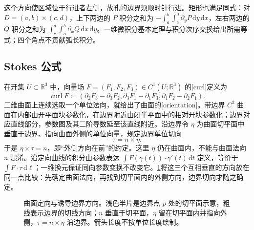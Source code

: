 这个方向使区域位于行进者左侧，故孔的边界须顺时针行进。矩形也满足同式：对 \(D=(a,b)\times(c,d)\)，上下两边的 \(P\) 积分之和为 \(-\int_a^b\int_c^d\partial_yP\,\mathrm dy\,\mathrm dx\)，左右两边的 \(Q\) 积分之和为 \(\int_c^d\int_a^b\partial_xQ\,\mathrm dx\,\mathrm dy\)。一维微积分基本定理与积分次序交换给出所需等式；四个角点不贡献弧长积分。

\subsection{Stokes 公式}
\label{b2:subsec:010205}

在开集 \(U\subset\mathbb R^3\) 中，向量场 \(F=(F_1,F_2,F_3)\in C^1(U;\mathbb R^3)\) 的[curl]定义为
\[
 \operatorname{curl}F\coloneqq
 (\partial_2F_3-\partial_3F_2,
  \partial_3F_1-\partial_1F_3,
  \partial_1F_2-\partial_2F_1).
\]
二维曲面上连续选取一个单位法向，就给出了曲面的[orientation]。带边界 \(C^2\) 曲面在内部由开平面块参数化，在边界附近由闭半平面中的相对开块参数化；边界对应直线部分，参数图及其二阶导数延至该直线附近。沿边界令 \(\eta\) 为曲面切平面中垂直于边界、指向曲面外侧的单位向量，规定边界单位切向
\[
 \tau=n\times\eta.
\]
于是 \(\eta\times\tau=n\)，即“外侧方向在前”的约定。这里 \(\eta\) 仍在曲面内，不能与曲面法向 \(n\) 混淆。沿定向曲线的积分由参数表达 \(\int F(\gamma(t))\cdot\gamma'(t)\,\mathrm dt\) 定义，等价于 \(\int F\cdot\tau\,\mathrm d\ell\)；一维换元保证同向参数变换不改变它。\cref{b2:fig:01-vector-stokes-orientation}将这三个互相垂直的方向放在同一点比较：先确定曲面法向，再找到切平面内的外侧方向，边界切向才随之确定。

\begin{figure}[htbp]
\centering
{}
\caption[曲面定向与诱导边界方向]{曲面定向与诱导边界方向。浅色半片是边界点 \(p\) 处的切平面示意，粗线表示边界的切线方向；\(n\) 垂直于切平面，\(\eta\) 留在切平面内并指向外侧，\(\tau=n\times\eta\) 沿边界。箭头长度不按单位长度绘制。}
\label{b2:fig:01-vector-stokes-orientation}
\end{figure}

